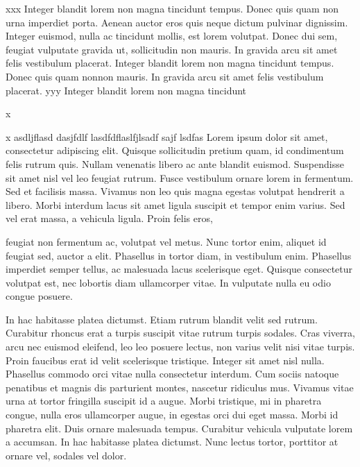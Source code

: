 \startrule
xxx Integer blandit lorem non magna tincidunt tempus. Donec quis quam non
urna imperdiet porta. Aenean auctor eros quis neque dictum pulvinar
dignissim. Integer euismod, nulla ac tincidunt mollis, est lorem
volutpat. Donec dui sem, feugiat vulputate gravida ut, sollicitudin
non mauris. In gravida arcu sit amet felis vestibulum placerat.
Integer blandit lorem non magna tincidunt tempus. Donec quis quam nonnon mauris. In gravida arcu sit amet felis vestibulum placerat.
yyy Integer blandit lorem non magna tincidunt 

\endrule{}

x

x
asdljflasd dasjfdlf lasdfdflaslfjlsadf sajf lsdfas Lorem ipsum dolor
sit amet, consectetur adipiscing elit. Quisque sollicitudin pretium
quam, id condimentum felis rutrum quis. Nullam venenatis libero ac
ante blandit euismod. Suspendisse sit amet nisl vel leo feugiat
rutrum. Fusce vestibulum ornare lorem in fermentum. Sed et facilisis
massa. Vivamus non leo quis magna egestas volutpat hendrerit a
libero. Morbi interdum lacus sit amet ligula suscipit et tempor enim
varius. Sed vel erat massa, a vehicula ligula. Proin felis eros,

feugiat non fermentum ac, volutpat vel metus. Nunc tortor enim,
aliquet id feugiat sed, auctor a elit. Phasellus in tortor diam, in
vestibulum enim. Phasellus imperdiet semper tellus, ac malesuada lacus
scelerisque eget. Quisque consectetur volutpat est, nec lobortis diam
ullamcorper vitae. In vulputate nulla eu odio congue posuere.

In hac habitasse platea dictumst. Etiam rutrum blandit velit sed
rutrum. Curabitur rhoncus erat a turpis suscipit vitae rutrum turpis
sodales. Cras viverra, arcu nec euismod eleifend, leo leo posuere
lectus, non varius velit nisi vitae turpis. Proin faucibus erat id
velit scelerisque tristique. Integer sit amet nisl nulla. Phasellus
commodo orci vitae nulla consectetur interdum. Cum sociis natoque
penatibus et magnis dis parturient montes, nascetur ridiculus
mus. Vivamus vitae urna at tortor fringilla suscipit id a augue. Morbi
tristique, mi in pharetra congue, nulla eros ullamcorper augue, in
egestas orci dui eget massa. Morbi id pharetra elit. Duis ornare
malesuada tempus. Curabitur vehicula vulputate lorem a accumsan. In
hac habitasse platea dictumst. Nunc lectus tortor, porttitor at ornare
vel, sodales vel dolor.

